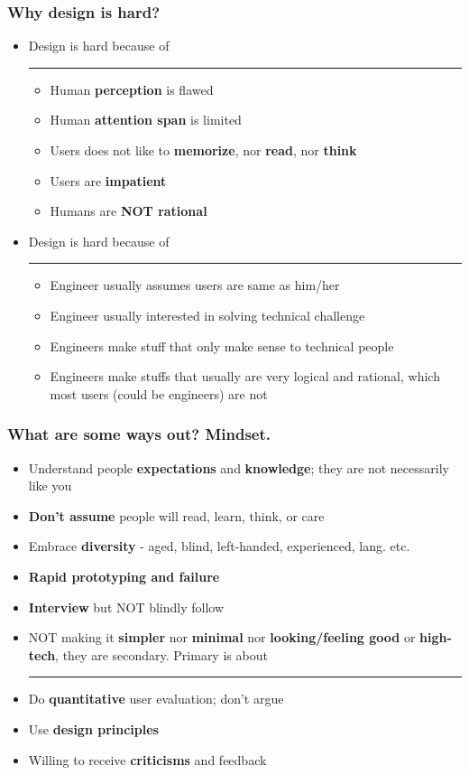 \documentclass{beamer}
\begin{document}
\begin{frame}
\frametitle{Why design is hard?}
\begin{itemize}
\item Design is hard because of \rule{2cm}{0.15mm}
\begin{itemize}
	\item Human \textbf{perception} is flawed
	\item Human \textbf{attention span} is limited
	\item Users does not like to \textbf{memorize}, nor \textbf{read}, nor \textbf{think}
	\item Users are \textbf{impatient}
	\item Humans are \textbf{NOT rational}
\end{itemize}
\end{itemize}
\begin{itemize}
\item Design is hard because of \rule{2cm}{0.15mm}
\begin{itemize}
	\item Engineer usually assumes users are same as him/her
	\item Engineer usually interested in solving technical challenge
	\item Engineers make stuff that only make sense to technical people
	\item Engineers make stuffs that usually are very logical and rational, which most users (could be engineers) are not
\end{itemize}
\end{itemize}
\end{frame}

\begin{frame}
\frametitle{What are some ways out? Mindset.}
\begin{itemize}
	\item Understand people \textbf{expectations} and \textbf{knowledge}; they are not necessarily like you
	\item \textbf{Don't assume} people will read, learn, think, or care
	\item Embrace \textbf{diversity} - aged, blind, left-handed, experienced,  lang. etc.
	\item  \textbf{Rapid prototyping and failure}
	\item \textbf{Interview} but NOT blindly follow
	\item NOT making it \textbf{simpler} nor \textbf{minimal} nor \textbf{ looking/feeling good} or \textbf{high-tech},  they are secondary.  Primary is about \rule{2cm}{0.15mm}
	\item Do \textbf{quantitative} user evaluation; don't argue
	\item Use \textbf{design principles}
	\item Willing to receive \textbf{criticisms} and feedback
\end{itemize}
\end{frame}
\end{document}
